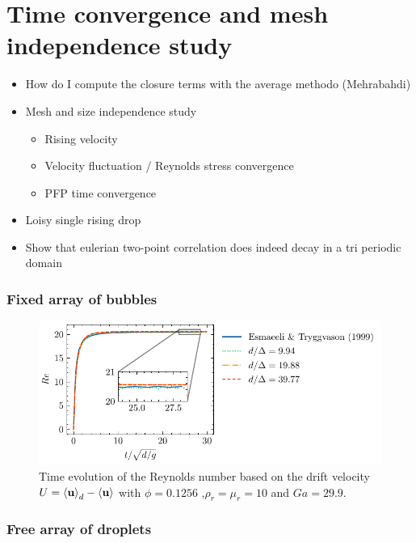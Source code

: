 \section{Time convergence and mesh independence study}

\begin{itemize}
    \item How do I compute the closure terms with the average methodo (Mehrabahdi)
    \item Mesh and size independence study 
    \begin{itemize}
        \item Rising velocity
        \item Velocity fluctuation / Reynolds stress convergence 
        \item PFP time convergence
    \end{itemize}
    \item Loisy single rising drop
    \item Show that eulerian two-point correlation does indeed decay in a tri periodic domain 
\end{itemize}

\subsubsection{Fixed array of bubbles}

\begin{figure}[h!]
    \centering
    \includegraphics[height = 0.3\textwidth]{image/VALIDATION2.0/Loisy/Re.pdf}
    \caption{Time evolution of the Reynolds number based on the drift velocity $U = \left<\textbf{u}\right>_d - \left<\textbf{u}\right>$ with $\phi = 0.1256$ ,$\rho_r =\mu_r =10$ and $Ga = 29.9$.}
\end{figure}


\subsubsection{Free array of droplets}



